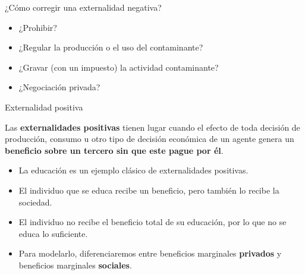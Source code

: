 \documentclass{beamer}
\begin{document}
\begin{frame}{¿Cómo corregir una externalidad negativa?}
    \begin{itemize}
        \item ¿Prohibir?
        \vspace{1mm}
        \item ¿Regular la producción o el uso del contaminante?
        \vspace{1mm}
        \item ¿Gravar (con un impuesto) la actividad contaminante?
        \vspace{1mm}
        \item ¿Negociación privada?
    \end{itemize}
\end{frame}


\begin{frame}{Externalidad positiva}
    \begin{boxB}
    \centering
        Las \textbf{externalidades positivas} tienen lugar cuando el efecto de toda decisión de producción, consumo u otro tipo de decisión económica de un agente genera un \textbf{beneficio sobre un tercero sin que este pague por él}.
    \end{boxB}
    \begin{itemize}
        \item La educación es un ejemplo clásico de externalidades positivas.
        \item El individuo que se educa recibe un beneficio, pero también lo recibe la sociedad.
        \item El individuo no recibe el beneficio total de su educación, por lo que no se educa lo suficiente.
        \item Para modelarlo, diferenciaremos entre beneficios marginales \textbf{privados} y beneficios marginales \textbf{sociales}.
    \end{itemize}
\end{frame}
\end{document}
